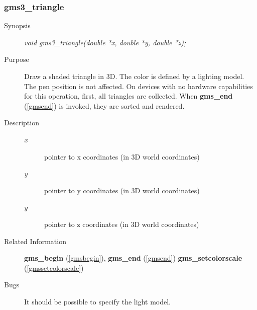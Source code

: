 \newpage



\subsubsection{gms3\_triangle\label{gms3triangle}}
\begin{description}
\item[Synopsis]\mbox{}


{\em void    gms3\_triangle(double *x, double *y, double *z);\/}
\item[Purpose]\mbox{}


Draw a  shaded triangle in 3D. The color is defined by
a lighting model.
The pen position is not affected.
On devices with no hardware capabilities for this operation,
first, all triangles are collected.
When 
{\bf gms\_end} (\ref{gmsend})
is invoked, they are sorted and rendered.

\item[Description]\mbox{}


\begin{description}
\item[{\em x\/}]\mbox{}

 pointer to x coordinates (in 3D world coordinates)
\item[{\em y\/}]\mbox{}

 pointer to y coordinates (in 3D world coordinates)
\item[{\em y\/}]\mbox{}

 pointer to z coordinates (in 3D world coordinates)
\end{description}

\item[Related Information]\mbox{}


{\bf gms\_begin} (\ref{gmsbegin}), 
{\bf gms\_end} (\ref{gmsend})
{\bf gms\_setcolorscale} (\ref{gmssetcolorscale})
\item[Bugs]\mbox{}


It should be possible to specify the light model.
\end{description}



\newpage



